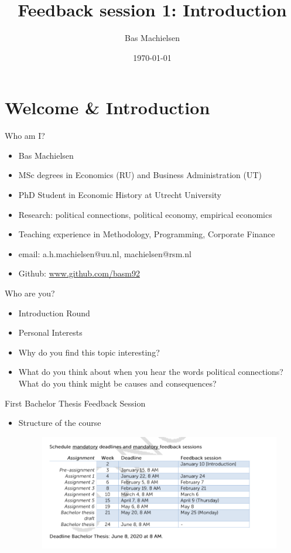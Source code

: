 \documentclass[aspectratio = 169, 12pt]{beamer}
\title{Feedback session 1: Introduction}
\author[Bas Machielsen (RSM)]{Bas Machielsen}
\date{\today}
\institute[]{\normalsize Rotterdam School of Management \\
\texttt{\href{http://bas-m.netlify.app}{bas-m.netlify.app}} \hspace{5pt} \texttt{\href{http://github.com/basm92}{github.com/basm92}}}
\begin{document}
	\titlepage
	\clearpage
	\section{Welcome \& Introduction}
	
	\begin{frame}{Who am I?}
	    \begin{itemize}
	        \item Bas Machielsen
	        \item MSc degrees in Economics (RU) and Business Administration (UT)
	        \item PhD Student in Economic History at Utrecht University
	        \item Research: political connections, political economy, empirical economics
	        \item Teaching experience in Methodology, Programming, Corporate Finance
	        \item email: a.h.machielsen@uu.nl, machielsen@rsm.nl
	        \item Github: \url{www.github.com/basm92}
	    \end{itemize}
	\end{frame}
	
	\begin{frame}{Who are you?}
	    \begin{itemize}
	        \item Introduction Round
	        \item Personal Interests
	        \item Why do you find this topic interesting?
	        \item What do you think about when you hear the words political connections? What do you think might be causes and consequences?
	    \end{itemize}
	\end{frame}
	
	\begin{frame}{First Bachelor Thesis Feedback Session}
	    \begin{itemize}
		    \item Structure of the course
		    \begin{figure}
		        \centering
		        \includegraphics[width = 1.0\textwidth]{screen1.png}
		        \label{fig:my_label}
		    \end{figure}
		 \end{itemize}
	\end{frame}
\end{document}
